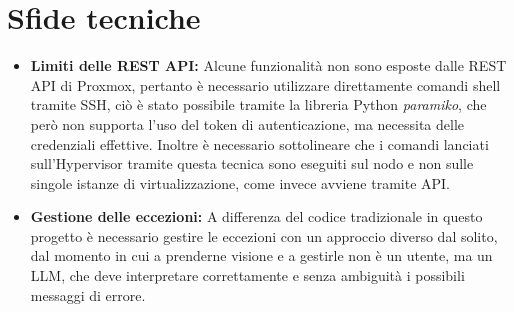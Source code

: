 \section{Sfide tecniche}
\begin{itemize}
    \item \textbf{Limiti delle REST API:} Alcune funzionalità non sono esposte dalle REST API di Proxmox, pertanto è necessario utilizzare direttamente comandi shell tramite SSH, ciò è stato possibile tramite la libreria Python \textit{paramiko}, che però non supporta l'uso del token di autenticazione, ma necessita delle credenziali effettive. Inoltre è necessario sottolineare che i comandi lanciati sull'Hypervisor tramite questa tecnica sono eseguiti sul nodo e non sulle singole istanze di virtualizzazione, come invece avviene tramite API.
    \item \textbf{Gestione delle eccezioni:} A differenza del codice tradizionale in questo progetto è necessario gestire le eccezioni con un approccio diverso dal solito, dal momento in cui a prenderne visione e a gestirle non è un utente, ma un LLM, che deve interpretare correttamente e senza ambiguità i possibili messaggi di errore.
\end{itemize}
